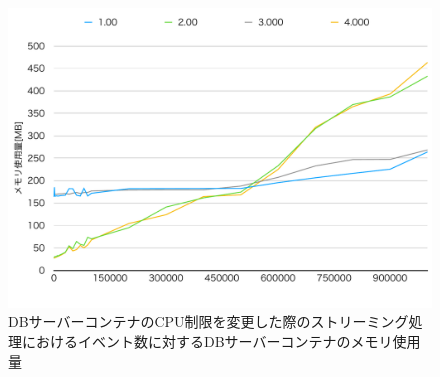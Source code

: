 \documentclass[../../../../../main]{subfiles}
\begin{document}
    \begin{figure}[H]
        \centering
        \includegraphics[width=12cm]{graph}
        \caption{DBサーバーコンテナのCPU制限を変更した際のストリーミング処理におけるイベント数に対するDBサーバーコンテナのメモリ使用量}
        \label{fig:stream-change-db-cpu-limit-db-memory-app_4_8192-db_1024}
    \end{figure}
\end{document}
